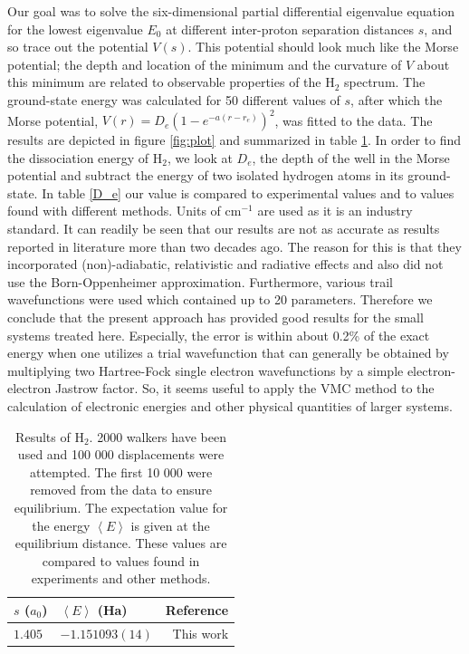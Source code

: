 \documentclass{article}
\begin{document}
Our goal was to solve the six-dimensional partial differential eigenvalue equation for the lowest eigenvalue $E_0$ at different inter-proton separation distances $s$, and so trace out the potential $V(s)$. This potential should look much like the Morse potential; the depth and location of the minimum and the curvature of $V$ about this minimum are related to observable properties of the H$_2$ spectrum. The ground-state energy was calculated for 50 different values of $s$, after which the Morse potential, $V(r) = D_e ( 1-e^{-a(r-r_e)} )^2$, was fitted to the data. The results are depicted in figure \ref{fig:plot} and summarized in table \ref{H2}. In order to find the dissociation energy of H$_2$, we look at $D_e$, the depth of the well in the Morse potential and subtract the energy of two isolated hydrogen atoms in its ground-state. In table \ref{D_e} our value is compared to experimental values and to values found with different methods. Units of cm$^{-1}$ are used as it is an industry standard. It can readily be seen that our results are not as accurate as results reported in literature \citep{traynor1991quantum, szalewicz1986new, wolniewicz1983x} more than two decades ago. The reason for this is that they incorporated (non)-adiabatic, relativistic and radiative effects and also did not use the Born-Oppenheimer approximation. Furthermore, various trail wavefunctions were used which contained up to 20 parameters. Therefore we conclude that the present approach has provided good results for the small systems treated here. Especially, the error is within about 0.2\% of the exact energy when one utilizes a trial wavefunction that can generally be obtained by multiplying two Hartree-Fock single electron wavefunctions by a simple electron-electron Jastrow factor. So, it seems useful to apply the VMC method to the calculation of electronic energies and other physical quantities of larger systems.

\begin{table}
\caption{Results of H$_2$. 2000 walkers have been used and 100 000 displacements were attempted. The first 10 000 were removed from the data to ensure equilibrium. The expectation value for the energy $\left\langle E \right\rangle$ is given at the equilibrium distance. These values are compared to values found in experiments and other methods.}
\label{H2}
\centering
\begin{tabular}{llr}
\hline
$s$ ($a_0$) & $\left\langle E \right\rangle$ (Ha) & Reference  \\ \hline
$1.405$ & $-1.151093(14)$ & This work \\
\end{tabular}
\end{table}
\end{document}
